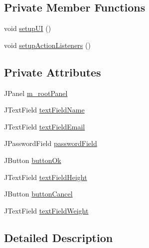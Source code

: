 \subsection*{Private Member Functions}
\begin{DoxyCompactItemize}
\item 
void \mbox{\hyperlink{classcom_1_1activitytracker_1_1_create_user_window_a41715d85194c6bb84cf6969f771940dc}{setup\+UI}} ()
\item 
void \mbox{\hyperlink{classcom_1_1activitytracker_1_1_create_user_window_a174a05a389ca6f3b7979ac9c5028a3ae}{setup\+Action\+Listeners}} ()
\end{DoxyCompactItemize}
\subsection*{Private Attributes}
\begin{DoxyCompactItemize}
\item 
J\+Panel \mbox{\hyperlink{classcom_1_1activitytracker_1_1_create_user_window_a5a678326afe519b6a2c9e7a2d9eff87c}{m\+\_\+root\+Panel}}
\item 
J\+Text\+Field \mbox{\hyperlink{classcom_1_1activitytracker_1_1_create_user_window_aa2b8cf1781a8a1534dbf5c5b98332c05}{text\+Field\+Name}}
\item 
J\+Text\+Field \mbox{\hyperlink{classcom_1_1activitytracker_1_1_create_user_window_a4f6010631cb7be5a2ae3691bdca31483}{text\+Field\+Email}}
\item 
J\+Password\+Field \mbox{\hyperlink{classcom_1_1activitytracker_1_1_create_user_window_a29be9c267c003ae90731199d8257dc0a}{password\+Field}}
\item 
J\+Button \mbox{\hyperlink{classcom_1_1activitytracker_1_1_create_user_window_aa22864c8baa65b46fe9a7621748d7841}{button\+Ok}}
\item 
J\+Text\+Field \mbox{\hyperlink{classcom_1_1activitytracker_1_1_create_user_window_ac5ce2bc2efbc06d578d93fb3f26aad1c}{text\+Field\+Height}}
\item 
J\+Button \mbox{\hyperlink{classcom_1_1activitytracker_1_1_create_user_window_a975a5cc35d145a3efa4d9e340776ca63}{button\+Cancel}}
\item 
J\+Text\+Field \mbox{\hyperlink{classcom_1_1activitytracker_1_1_create_user_window_ae84b4d977150419bfabc11fbd009392c}{text\+Field\+Weight}}
\end{DoxyCompactItemize}


\subsection{Detailed Description}


